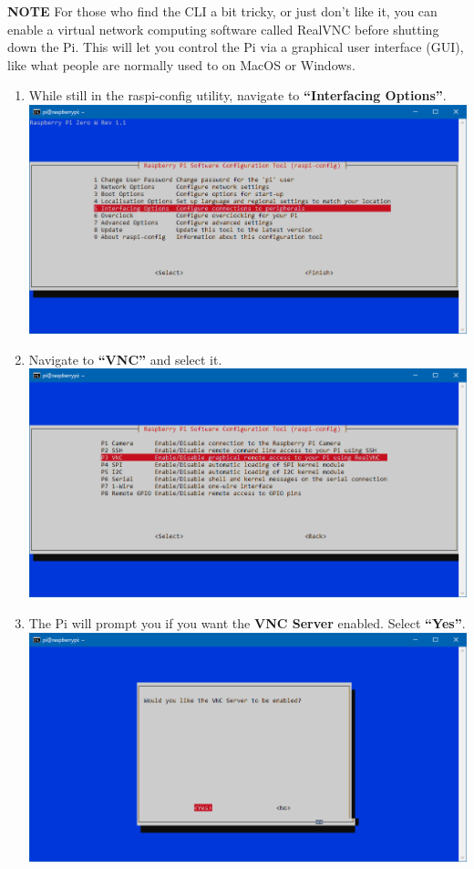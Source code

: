 \documentclass{article}
\begin{document}
\textbf{NOTE} For those who find the CLI a bit tricky, or just don't like it, you can enable a virtual network computing software called RealVNC before shutting down the Pi. This will let you control the Pi via a graphical user interface (GUI), like what people are normally used to on MacOS or Windows.

\begin{enumerate}
  \item While still in the raspi-config utility, navigate to \textbf{``Interfacing Options''}.
  \newline
  \newline
  \includegraphics[width=1.00\textwidth]{rcifoptions}
  \item Navigate to \textbf{``VNC''} and select it.
  \newline
  \newline
  \includegraphics[width=1.00\textwidth]{rcvnc}
  \item The Pi will prompt you if you want the \textbf{VNC Server} enabled. Select \textbf{``Yes''}.
  \newline
  \newline
  \includegraphics[width=1.00\textwidth]{rcvncenable}

\end{enumerate}
\end{document}
